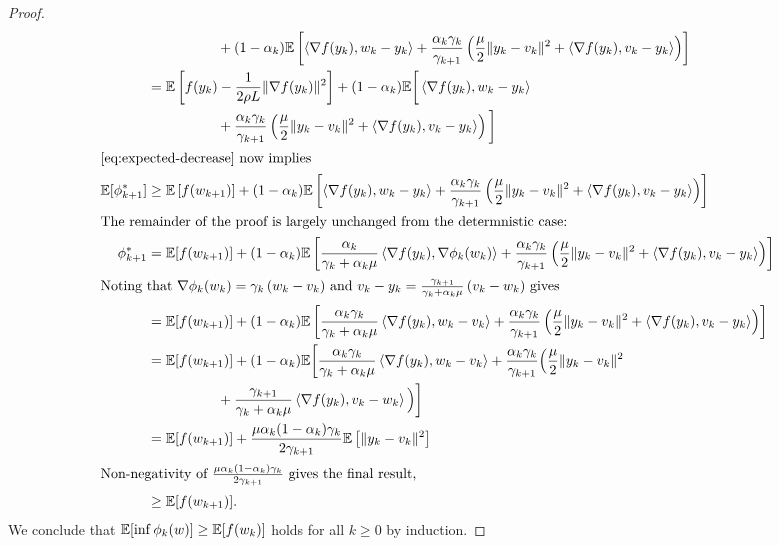 \begin{proof}
\begin{align*}
        & \hspace{5em} + (1-\alpha_k) \E\sbr{\abr{\grad(\yk), \wk - \yk} + \frac{\alpha_k\gamma_k}{\gamma_{k+1}}\rbr{\frac{\mu}{2} \norm{\yk - v_k}^2 + \abr{\grad(\yk), v_k - \yk}}} \\
        &=  \E\sbr{f(\yk) - \frac{1}{2\rho L} \norm{\grad(\yk)}^2} + (1-\alpha_k) \E\bigg[\abr{\grad(\yk), \wk - \yk} \\ & \hspace{5em} + \frac{\alpha_k\gamma_k}{\gamma_{k+1}}\rbr{\frac{\mu}{2} \norm{\yk - v_k}^2 + \abr{\grad(\yk), v_k - \yk}}\bigg] \\
        \intertext{\autoref{eq:expected-decrease} now implies}
        \E[\phi_{k+1}^*] &\geq \E\sbr{f(\wkk)} + (1-\alpha_k) \E\sbr{\abr{\grad(\yk), \wk - \yk} + \frac{\alpha_k\gamma_k}{\gamma_{k+1}}\rbr{\frac{\mu}{2} \norm{\yk - v_k}^2 + \abr{\grad(\yk), v_k - \yk}}} \\
        \intertext{The remainder of the proof is largely unchanged from the determnistic case:}
        \phi_{k+1}^*  &=  \E[f(\wkk)] + (1-\alpha_k) \E\sbr{\frac{\alpha_k}{\gamma_k + \alpha_k \mu} \abr{\grad(\yk), \nabla\phi_k(\wk)} + \frac{\alpha_k\gamma_k}{\gamma_{k+1}}\rbr{\frac{\mu}{2} \norm{\yk - v_k}^2 + \abr{\grad(\yk), v_k - \yk}}} \\
        \intertext{Noting that \( \nabla \phi_k(\wk) = \gamma_k \rbr{\wk - v_k} \) and \( v_k - \yk = \frac{\gamma_{k+1}}{\gamma_k + \alpha_k \mu}\rbr{v_k - \wk} \) gives }
        &= \E[f(\wkk)] +(1-\alpha_k) \E\sbr{\frac{\alpha_k \gamma_k}{\gamma_k + \alpha_k \mu} \abr{\grad(\yk), \wk - v_k} + \frac{\alpha_k\gamma_k}{\gamma_{k+1}}\rbr{\frac{\mu}{2} \norm{\yk - v_k}^2 + \abr{\grad(\yk), v_k - \yk}}} \\
        &= \E[f(\wkk)] + (1-\alpha_k) \E\bigg[\frac{\alpha_k \gamma_k}{\gamma_k + \alpha_k \mu} \abr{\grad(\yk), \wk - v_k} + \frac{\alpha_k\gamma_k}{\gamma_{k+1}}\Big(\frac{\mu}{2} \norm{\yk - v_k}^2 \\
        & \hspace{5em} + \frac{\gamma_{k+1}}{\gamma_k + \alpha_k \mu} \abr{\grad(\yk), v_k - \wk}\Big)\bigg] \\
        &= \E[f(\wkk)] + \frac{\mu \alpha_k(1-\alpha_k)\gamma_k}{2 \gamma_{k+1}} \E\sbr{\norm{\yk - v_k}^2} \\
        \intertext{Non-negativity of \( \frac{\mu \alpha_k(1-\alpha_k)\gamma_k}{2 \gamma_{k+1}} \) gives the final result,} 
        &\geq \E[f(\wkk)].
    \end{align*}
    We conclude that \( \mathbb{E}[\inf \phi_{k}(w)] \geq \mathbb{E}[f(w_k)] \) holds for all \( k \geq 0 \) by induction. 
\end{proof}

